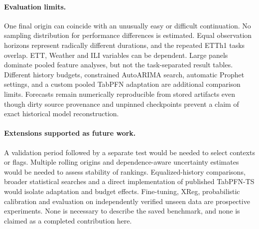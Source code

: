 \paragraph{Evaluation limits.}
One final origin can coincide with an unusually easy or difficult continuation. No sampling distribution for performance differences is estimated. Equal observation horizons represent radically different durations, and the repeated ETTh1 tasks overlap. ETT, Weather and ILI variables can be dependent. Large panels dominate pooled feature analyses, but not the task-separated result tables. Different history budgets, constrained AutoARIMA search, automatic Prophet settings, and a custom pooled TabPFN adaptation are additional comparison limits. Forecasts remain numerically reproducible from stored artifacts even though dirty source provenance and unpinned checkpoints prevent a claim of exact historical model reconstruction.

\paragraph{Extensions supported as future work.}
A validation period followed by a separate test would be needed to select contexts or flags. Multiple rolling origins and dependence-aware uncertainty estimates would be needed to assess stability of rankings. Equalized-history comparisons, broader statistical searches and a direct implementation of published TabPFN-TS would isolate adaptation and budget effects. Fine-tuning, XReg, probabilistic calibration and evaluation on independently verified unseen data are prospective experiments. None is necessary to describe the saved benchmark, and none is claimed as a completed contribution here.
